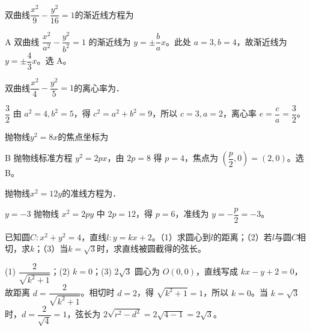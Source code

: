 

\begin{question}[GPT生成]
双曲线$\dfrac{x^2}{9}-\dfrac{y^2}{16}=1$的渐近线方程为\choiceBox
{}
\end{question}
\begin{answer}{A}
双曲线 $\dfrac{x^2}{a^2}-\dfrac{y^2}{b^2}=1$ 的渐近线为 $y=\pm\dfrac ba x$。此处 $a=3,b=4$，故渐近线为 $y=\pm\dfrac43x$。选 A。
\end{answer}

\begin{question}[GPT生成]
双曲线$\dfrac{x^2}{4}-\dfrac{y^2}{5}=1$的离心率为\blank{3cm}．
\end{question}
\begin{answer}{$\dfrac32$}
由 $a^2=4,b^2=5$，得 $c^2=a^2+b^2=9$，所以 $c=3,a=2$，离心率 $e=\dfrac ca=\dfrac32$。
\end{answer}



\begin{question}[GPT生成]
抛物线$y^2=8x$的焦点坐标为\choiceBox
{}
\end{question}
\begin{answer}{B}
抛物线标准方程 $y^2=2px$，由 $2p=8$ 得 $p=4$，焦点为 $(\dfrac p2,0)=(2,0)$。选 B。
\end{answer}

\begin{question}[GPT生成]
抛物线$x^2=12y$的准线方程为\blank{3cm}．
\end{question}
\begin{answer}{$y=-3$}
抛物线 $x^2=2py$ 中 $2p=12$，得 $p=6$，准线为 $y=-\dfrac p2=-3$。
\end{answer}



\begin{question}[GPT生成]
已知圆$C:x^2+y^2=4$，直线$l:y=kx+2$。（1）求圆心到$l$的距离；（2）若$l$与圆$C$相切，求$k$；（3）当$k=\sqrt3$时，求直线被圆截得的弦长。
\end{question}
\solutionSpace{5cm}
\begin{answer}{(1) $\dfrac2{\sqrt{k^2+1}}$；(2) $k=0$；(3) $2\sqrt3$}
圆心为 $O(0,0)$，直线写成 $kx-y+2=0$，故距离 $d=\dfrac2{\sqrt{k^2+1}}$。相切时 $d=2$，得 $\sqrt{k^2+1}=1$，所以 $k=0$。当 $k=\sqrt3$ 时，$d=\dfrac2{\sqrt4}=1$，弦长为 $2\sqrt{r^2-d^2}=2\sqrt{4-1}=2\sqrt3$。
\end{answer}

